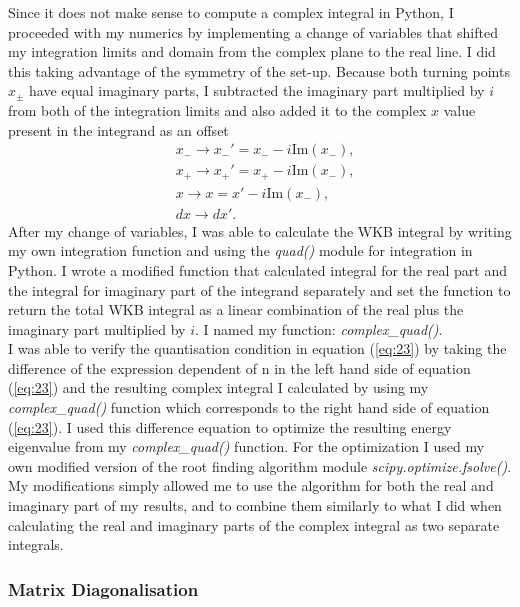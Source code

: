 \documentclass[10pt, a4paper, singlespacing, headsepline]{article}
\begin{document}
Since it does not make sense to compute a complex integral in Python, I proceeded with my numerics by implementing a change of variables that shifted my integration limits and domain from the complex plane to the real line. I did this taking advantage of the symmetry of the set-up. Because both turning points $x_{\pm}$ have equal imaginary parts, I subtracted the imaginary part multiplied by $i$ from both of the integration limits and also added it to the complex $x$ value present in the integrand as an offset
\begin{equation} \label{eq:24}
\begin{split}
&x_{-}\rightarrow x_{-}' = x_{-} - i \mathrm{Im}(x_{-}),\\
&x_{+}\rightarrow x_{+}' = x_{+} - i \mathrm{Im}(x_{-}),\\
&x\rightarrow x = x' - i \mathrm{Im}(x_{-}),\\
&dx\rightarrow dx'.
\end{split}
\end{equation}
After my change of variables, I was able to calculate the WKB integral by writing my own integration function and using the \textit{quad()} module for integration in Python. I wrote a modified function that calculated integral for the real part and the integral for imaginary part of the integrand separately and set the function to return the total WKB integral as a linear combination of the real plus the imaginary part multiplied by $i$. I named my function: \textit{complex\_quad()}.\\
I was able to verify the quantisation condition in equation (\ref{eq:23}) by taking the difference of the expression dependent of n in the left hand side of equation (\ref{eq:23}) and the resulting complex integral I calculated by using my \textit{complex\_quad()} function which corresponds to the right hand side of equation (\ref{eq:23}). I used this difference equation to optimize the resulting energy eigenvalue from my \textit{complex\_quad()} function. For the optimization I used my own modified version of the root finding algorithm module \textit{scipy.optimize.fsolve()}. My modifications simply allowed me to use the algorithm for both the real and imaginary part of my results, and to combine them similarly to what I did when calculating the real and imaginary parts of the complex integral as two separate integrals.


\subsubsection{Matrix Diagonalisation}
\end{document}
